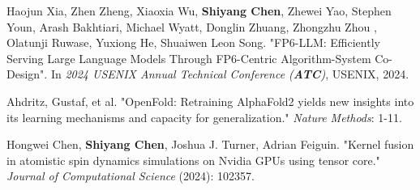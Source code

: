 \documentclass[12pt, a4paper]{article}
\newcommand{\years}[1]{\marginnote{#1}}
\begin{document}
\vspace*{2mm}

\years{2024}

Haojun Xia, Zhen Zheng, Xiaoxia Wu, \textbf{Shiyang Chen}, Zhewei Yao, Stephen Youn, Arash Bakhtiari, Michael Wyatt, Donglin Zhuang, Zhongzhu Zhou , Olatunji Ruwase, Yuxiong He, Shuaiwen Leon Song. "FP6-LLM: Efficiently Serving Large Language Models Through FP6-Centric Algorithm-System Co-Design". In \textit{2024 USENIX Annual Technical Conference (\textbf{ATC})}, USENIX, 2024.

\vspace*{2mm}

\years{2024} Ahdritz, Gustaf, et al. "OpenFold: Retraining AlphaFold2 yields new insights into its learning mechanisms and capacity for generalization." \textit{Nature Methods}: 1-11.

\vspace*{2mm}

\years{2024} Hongwei Chen, \textbf{Shiyang Chen}, Joshua J. Turner, Adrian Feiguin. "Kernel fusion in atomistic spin dynamics simulations on Nvidia GPUs using tensor core." \textit{Journal of Computational Science} (2024): 102357.
\end{document}
